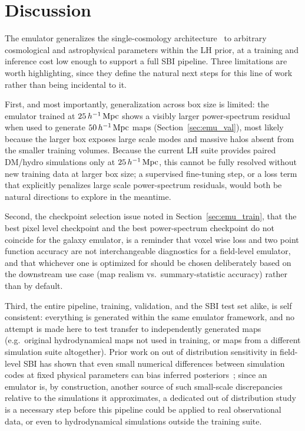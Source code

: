 \section{Discussion}
\label{sec:emu_discussion}

The \HGL emulator generalizes the single-cosmology \HALOgen
architecture~\citep{mishra2025largefastaccuratehi} to arbitrary cosmological and astrophysical
parameters within the \CAMELS LH prior, at a training and inference cost
low enough to support a full SBI pipeline. Three limitations are worth
highlighting, since they define the natural next steps for this line of
work rather than being incidental to it.

First, and most importantly, generalization across box size is limited:
the emulator trained at $25\,h^{-1}\,\mathrm{Mpc}$ shows a visibly larger power-spectrum
residual when used to generate $50\,h^{-1}\,\mathrm{Mpc}$ maps
(Section~\ref{sec:emu_val}), most likely because the larger box exposes
large scale modes and massive halos absent from the smaller training
volumes. Because the current \CAMELS LH suite provides paired DM/hydro
simulations only at $25\,h^{-1}\,\mathrm{Mpc}$, this cannot be fully resolved without new
training data at larger box size; a supervised fine-tuning step, or a
loss term that explicitly penalizes large scale power-spectrum residuals,
would both be natural directions to explore in the meantime.

Second, the checkpoint selection issue noted in Section~\ref{sec:emu_train},
that the best pixel level checkpoint and the best power-spectrum checkpoint
do not coincide for the galaxy emulator, is a reminder that voxel wise loss
and two point function accuracy are not interchangeable diagnostics for a
field-level emulator, and that whichever one is optimized for should be
chosen deliberately based on the downstream use case (map realism vs.\
summary-statistic accuracy) rather than by default.

Third, the entire pipeline, training, validation, and the SBI test set
alike, is self consistent: everything is generated within the same emulator
framework, and no attempt is made here to test transfer to independently
generated maps (e.g.\ original \CAMELS hydrodynamical maps not used in
training, or maps from a different simulation suite altogether). Prior work
on out of distribution sensitivity in field-level SBI has shown that even
small numerical differences between simulation codes at fixed physical
parameters can bias inferred posteriors~\citep{Bayer_2025}; since an
emulator is, by construction, another source of such small-scale
discrepancies relative to the simulations it approximates, a dedicated
out of distribution study is a necessary step before this pipeline could be
applied to real observational data, or even to hydrodynamical simulations
outside the training suite.

